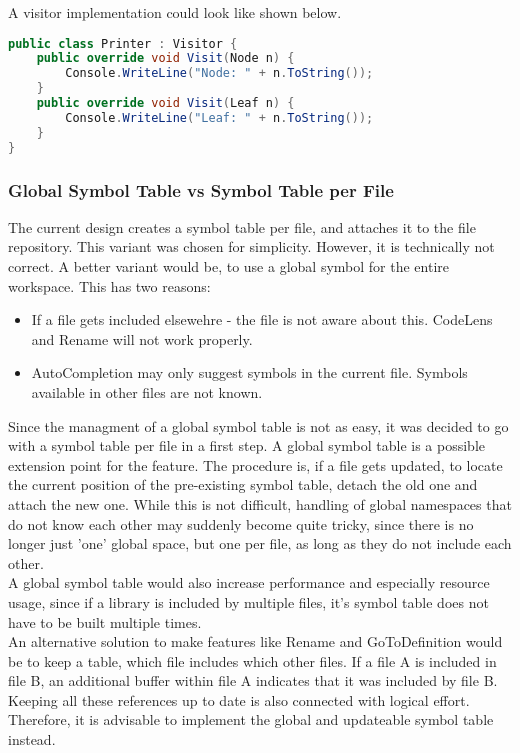 A visitor implementation could look like shown below.

\begin{lstlisting}[language=csharp, caption={Example for Visitor}, captionpos=b, label={lst:visitor}]
public class Printer : Visitor {
    public override void Visit(Node n) {
        Console.WriteLine("Node: " + n.ToString());
    }
    public override void Visit(Leaf n) {
        Console.WriteLine("Leaf: " + n.ToString());
    }
}
\end{lstlisting}

\subsubsection{Global Symbol Table vs Symbol Table per File}
\label{section:globalSymbolTable}
The current design creates a symbol table per file, and attaches it to the file repository.
This variant was chosen for simplicity.
However, it is technically not correct.
A better variant would be, to use a global symbol for the entire workspace.
This has two reasons:
\begin{itemize}
    \item If a file gets included elsewehre - the file is not aware about this. CodeLens and Rename will not work properly.
    \item AutoCompletion may only suggest symbols in the current file. Symbols available in other files are not known.
\end{itemize}

Since the managment of a global symbol table is not as easy, it was decided to go with a symbol table per file in a first step.
A global symbol table is a possible extension point for the feature.
The procedure is, if a file gets updated, to locate the current position of the pre-existing symbol table, detach the old one and attach the new one.
While this is not difficult, handling of global namespaces that do not know each other may suddenly become quite tricky,
since there is no longer just 'one' global space, but one per file, as long as they do not include each other.\\

A global symbol table would also increase performance and especially resource usage, since if a library is included by multiple files, it's symbol table does not have to be built multiple times.\\

An alternative solution to make features like Rename and GoToDefinition would be to keep a table, which file includes which other files.
If a file A is included in file B, an additional buffer within file A indicates that it was included by file B.
Keeping all these references up to date is also connected with logical effort.
Therefore, it is advisable to implement the global and updateable symbol table instead.

